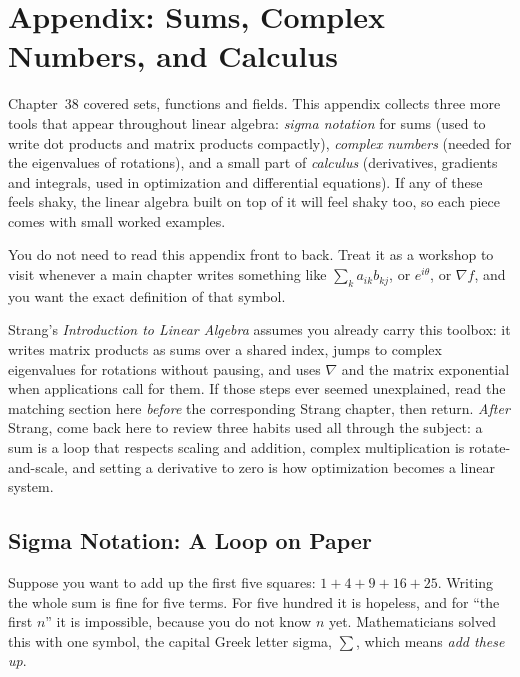 \chapter{Appendix: Sums, Complex Numbers, and Calculus}

Chapter~38 covered sets, functions and fields. This appendix collects three more tools
that appear throughout linear algebra: \emph{sigma notation} for sums (used to write dot
products and matrix products compactly), \emph{complex numbers} (needed for the
eigenvalues of rotations), and a small part of \emph{calculus} (derivatives, gradients and
integrals, used in optimization and differential equations). If any of these feels shaky,
the linear algebra built on top of it will feel shaky too, so each piece comes with small
worked examples.

You do not need to read this appendix front to back. Treat it as a workshop to visit
whenever a main chapter writes something like $\sum_{k} a_{ik} b_{kj}$, or $e^{i\theta}$,
or $\nabla f$, and you want the exact definition of that symbol.

\begin{strangbox}
Strang's \emph{Introduction to Linear Algebra} assumes you already carry this toolbox: it writes
matrix products as sums over a shared index, jumps to complex eigenvalues for rotations without
pausing, and uses $\nabla$ and the matrix exponential when applications call for them. If those steps
ever seemed unexplained, read the matching section here \emph{before} the corresponding Strang
chapter, then return. \emph{After} Strang, come back here to review three habits used all through
the subject: a sum is a loop that respects scaling and addition, complex multiplication is
rotate-and-scale, and setting a derivative to zero is how optimization becomes a linear system.
\end{strangbox}

\section{Sigma Notation: A Loop on Paper}
\label{ch39:sigma}

Suppose you want to add up the first five squares: $1 + 4 + 9 + 16 + 25$. Writing the whole sum is
fine for five terms. For five hundred it is hopeless, and for ``the first $n$'' it is impossible,
because you do not know $n$ yet. Mathematicians solved this with one symbol, the capital Greek
letter sigma, $\sum$, which means \emph{add these up}.

